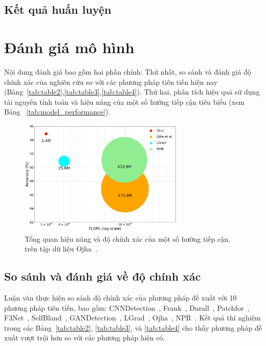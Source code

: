 \subsection{Kết quả huấn luyện}



\section{Đánh giá mô hình}
%
Nội dung đánh giá bao gồm hai phần chính: Thứ nhất, so sánh và đánh giá độ chính xác của nghiên cứu so với các phương pháp tiên tiến hiện nay (Bảng~\ref{tab:table2},\ref{tab:table3},\ref{tab:table4}). Thứ hai, phân tích hiệu quả sử dụng tài nguyên tính toán và hiệu năng của một số hướng tiếp cận tiêu biểu (xem Bảng ~\ref{tab:model_performance}).
%
%
%
\begin{figure}[h!]
	\centering
	\includegraphics[width=0.7\textwidth]{Images/tease.png}
	\caption{Tổng quan hiệu năng và độ chính xác của một số hướng tiếp cận, trên tập dữ liệu Ojha~\cite{Ojha2023TowardsUF}.}
	\label{fig:teaser}
\end{figure}
\subsection{So sánh và đánh giá về độ chính xác}
%
Luận văn thực hiện so sánh độ chính xác của phương pháp đề xuất với 10 phương pháp tiên tiến, bao gồm: 
CNNDetection~\cite{Wang2019CNNGeneratedIA}, 
Frank~\cite{Frank2020LeveragingFA}, 
Durall~\cite{Durall2020WatchYU}, 
Patchfor~\cite{Chai2020WhatMF}, 
F3Net~\cite{Qian2020ThinkingIF}, 
SelfBland~\cite{Shiohara2022DetectingDW}, 
GANDetection~\cite{Mandelli2022DetectingGI}, 
LGrad~\cite{Tan2023LearningOG}, 
Ojha~\cite{Ojha2023TowardsUF}, 
NPR~\cite{Tan2023RethinkingTU}. 
Kết quả thí nghiệm trong các Bảng~\ref{tab:table2}, \ref{tab:table3}, và \ref{tab:table4} cho thấy phương pháp đề xuất vượt trội hơn so với các phương pháp hiện có. 

